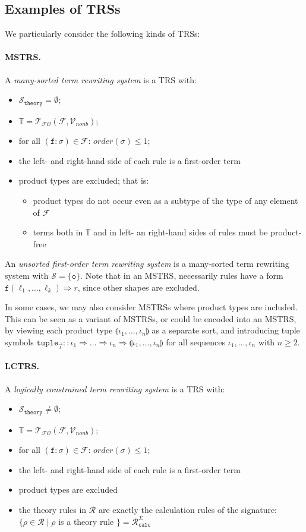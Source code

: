 \documentclass{lmcs}
\theoremstyle{theorem}\newtheorem{theorem}{Theorem}
\theoremstyle{theorem}\newtheorem{lemma}[theorem]{Lemma}
\theoremstyle{theorem}\newtheorem{corollary}[theorem]{Corollary}
\theoremstyle{definition}\newtheorem{definition}[theorem]{Definition}
\theoremstyle{definition}\newtheorem{example}[theorem]{Example}
\newcommand{\F}{\mathcal{F}}
\newcommand{\Vfree}{\mathcal{V}_{\mathit{nonb}}}
\newcommand{\Sorts}{\mathcal{S}}
\newcommand{\thSorts}{\mathcal{S}_{\mathtt{theory}}}
\newcommand{\FOTerms}{\mathcal{T}_{\mathcal{FO}}}
\newcommand{\Rules}{\mathcal{R}}
\newcommand{\Rulescalc}{\mathcal{R}_{\mathtt{calc}}}
\newcommand{\termsset}{\mathbb{T}}
\newcommand{\order}{\mathit{order}}
\newcommand{\asort}{\iota}
\newcommand{\atype}{\sigma}
\newcommand{\identifier}[1]{\mathtt{#1}}
\newcommand{\afun}{\identifier{f}}
\newcommand{\tuple}[2]{\llparenthesis #1,\dots,#2 \rrparenthesis}
\newcommand{\arrtype}{\Rightarrow}
\newcommand{\arrz}{\Rightarrow}
\newcommand{\symb}[1]{\mathtt{#1}}
\newcommand{\unitsort}{\mathtt{o}}
\newcommand{\myparagraph}[1]{\paragraph{\textbf{#1.}}}
\begin{document}
\subsection{Examples of TRSs}

We particularly consider the following kinds of TRSs:

\myparagraph{MSTRS}
A \emph{many-sorted term rewriting system} is a TRS with:
\begin{itemize}
\item $\thSorts = \emptyset$;
\item $\termsset = \FOTerms(\F,\Vfree)$;
\item for all $(\afun : \atype) \in \F$: $\order(\atype) \leq 1$;
\item the left- and right-hand side of each rule is a first-order term
\item product types are excluded; that is:
  \begin{itemize}
  \item product types do not occur even as a subtype of the type of any
    element of $\F$
  \item terms both in $\termsset$ and in left- an right-hand sides of rules must
    be product-free
  \end{itemize}
\end{itemize}

An \emph{unsorted first-order term rewriting system} is a many-sorted term
rewriting system with $\Sorts = \{ \unitsort \}$.  Note that in an MSTRS,
necessarily rules have a form $\afun(\ell_1,\dots,\ell_k) \arrz r$, since
other shapes are excluded.

In some cases, we may also consider MSTRSs where product types are included.
This can be seen as a variant of MSTRSs, or could be encoded into an MSTRS, by
viewing each product type $\tuple{\asort_1}{\asort_n}$ as a separate sort, and
introducing tuple symbols $\symb{tuple}_{\vec{\asort}} :: \asort_1 \arrtype
\dots \arrtype \asort_n \arrtype \tuple{\asort_1}{\asort_n}$ for all sequences
$\asort_1,\dots,\asort_n$ with $n \geq 2$.

\myparagraph{LCTRS}
A \emph{logically constrained term rewriting system} is a TRS with:
\begin{itemize}
\item $\thSorts \neq \emptyset$;
\item $\termsset = \FOTerms(\F,\Vfree)$;
\item for all $(\afun : \atype) \in \F$: $\order(\atype) \leq 1$;
\item the left- and right-hand side of each rule is a first-order term
\item product types are excluded
\item the theory rules in $\Rules$ are exactly the calculation rules of the
  signature: \\
  $\{ \rho \in \Rules \mid \rho$ is a theory rule $\} = \Rulescalc^\Sigma$
\end{itemize}
\end{document}
